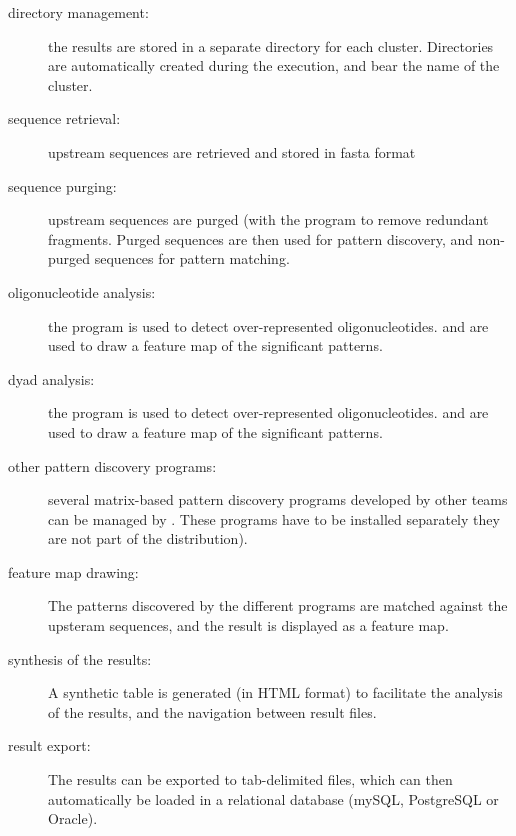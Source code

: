 \begin{description}
\item[directory management:] the results are stored in a separate
  directory for each cluster. Directories are automatically created
  during the execution, and bear the name of the cluster.

\item[sequence retrieval:] upstream sequences are retrieved and stored
  in fasta format

\item[sequence purging:] upstream sequences are purged (with the
  program  to remove redundant
  fragments. Purged sequences are then used for pattern discovery, and
  non-purged sequences for pattern matching.

\item[oligonucleotide analysis:] the program 
  is used to detect over-represented
  oligonucleotides.  and 
  are used to draw a feature map of the significant patterns.

\item[dyad analysis:] the program  is used to
  detect over-represented oligonucleotides.  and
   are used to draw a feature map of the
  significant patterns.

\item[other pattern discovery programs:] several matrix-based pattern
  discovery programs developed by other teams can be managed by
  . These programs have to be
  installed separately they are not part of the \RSAT distribution).

\item[feature map drawing:] The patterns discovered by the different
  programs are matched against the upsteram sequences, and the result
  is displayed as a feature map.

\item[synthesis of the results:] A synthetic table is generated (in HTML
  format) to facilitate the analysis of the results, and the
  navigation between result files.

\item[result export:] The results can be exported to tab-delimited
  files, which can then automatically be loaded in a relational
  database (mySQL, PostgreSQL or Oracle).

\end{description}

